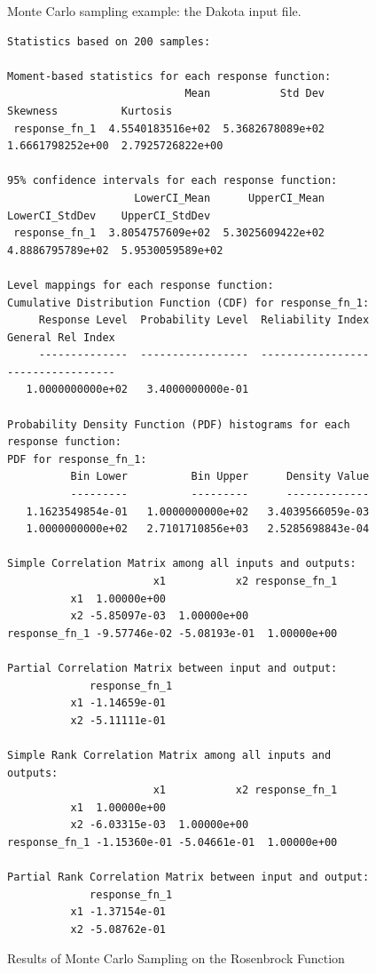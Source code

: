 \begin{figure}[ht!]
  \centering
  \begin{bigbox}
    \begin{small}
    \end{small}
  \end{bigbox}
  \caption{Monte Carlo sampling example: the Dakota input file.}
  \label{tutorial:rosenbrock_mc}
\end{figure}

\begin{figure}
\centering
\begin{bigbox}
\begin{footnotesize}
\begin{verbatim}
Statistics based on 200 samples:

Moment-based statistics for each response function:
                            Mean           Std Dev          Skewness          Kurtosis
 response_fn_1  4.5540183516e+02  5.3682678089e+02  1.6661798252e+00  2.7925726822e+00

95% confidence intervals for each response function:
                    LowerCI_Mean      UpperCI_Mean    LowerCI_StdDev    UpperCI_StdDev
 response_fn_1  3.8054757609e+02  5.3025609422e+02  4.8886795789e+02  5.9530059589e+02

Level mappings for each response function:
Cumulative Distribution Function (CDF) for response_fn_1:
     Response Level  Probability Level  Reliability Index  General Rel Index
     --------------  -----------------  -----------------  -----------------
   1.0000000000e+02   3.4000000000e-01

Probability Density Function (PDF) histograms for each response function:
PDF for response_fn_1:
          Bin Lower          Bin Upper      Density Value
          ---------          ---------      -------------
   1.1623549854e-01   1.0000000000e+02   3.4039566059e-03
   1.0000000000e+02   2.7101710856e+03   2.5285698843e-04

Simple Correlation Matrix among all inputs and outputs:
                       x1           x2 response_fn_1 
          x1  1.00000e+00 
          x2 -5.85097e-03  1.00000e+00 
response_fn_1 -9.57746e-02 -5.08193e-01  1.00000e+00 

Partial Correlation Matrix between input and output:
             response_fn_1 
          x1 -1.14659e-01 
          x2 -5.11111e-01 

Simple Rank Correlation Matrix among all inputs and outputs:
                       x1           x2 response_fn_1 
          x1  1.00000e+00 
          x2 -6.03315e-03  1.00000e+00 
response_fn_1 -1.15360e-01 -5.04661e-01  1.00000e+00 

Partial Rank Correlation Matrix between input and output:
             response_fn_1 
          x1 -1.37154e-01 
          x2 -5.08762e-01 
\end{verbatim}
\end{footnotesize}
\end{bigbox}
\caption{Results of Monte Carlo Sampling on the Rosenbrock Function}
\label{tutorial:results_mc}
\end{figure}


